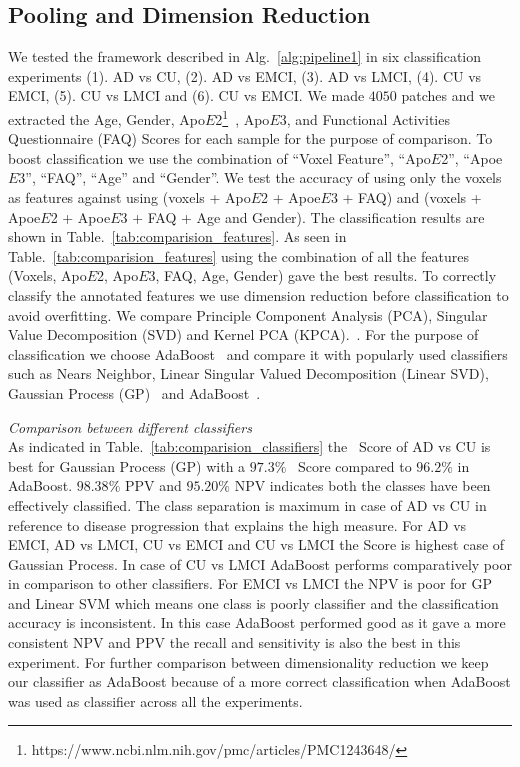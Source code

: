 \subsection{Pooling and Dimension Reduction}
\label{subsec:extraction}
We tested the framework described in Alg.~\ref{alg:pipeline1} in six classification experiments (1). AD vs CU, (2). AD vs EMCI, (3). AD vs LMCI, (4). CU vs EMCI, (5). CU vs LMCI and (6). CU vs EMCI. We made $ 4050 $ patches and we extracted the Age, Gender, Apo$E$2\footnote{https://www.ncbi.nlm.nih.gov/pmc/articles/PMC1243648/}~\citep{ghebranious2005detection,genin2011apoe}, Apo$E$3, and Functional Activities Questionnaire (FAQ) Scores for each sample for the purpose of comparison. To boost classification we use the combination of ``Voxel Feature'', ``Apo$E$2'', ``Apoe$E$3'', ``FAQ'', ``Age'' and ``Gender''. We test the accuracy of using only the voxels as features against using (voxels + Apo$ E $2 + Apoe$E$3 + FAQ) and (voxels + Apoe$E$2 + Apoe$ E $3 + FAQ + Age and Gender). The classification results are shown in Table.~\ref{tab:comparision_features}.
As seen in  Table.~\ref{tab:comparision_features} using the combination of all the features (Voxels, Apo$E$2, Apo$E$3, FAQ, Age, Gender) gave the best results.
To correctly classify the annotated features we use dimension reduction before classification to avoid overfitting. We compare Principle Component Analysis (PCA), Singular Value Decomposition (SVD) and Kernel PCA (KPCA).~\citep{mika1998kernel}. 
For the purpose of classification we choose AdaBoost~\citep*{shawe2004kernel} and compare it with popularly used classifiers such as Nears Neighbor, Linear Singular Valued Decomposition (Linear SVD), Gaussian Process (GP)~\citep{rasmussen2006gaussian} and AdaBoost~\citep{rojas2009adaboost}. 

\textit{Comparison between different classifiers}\\
As indicated in Table.~\ref{tab:comparision_classifiers} the \F~Score of AD vs CU is best for Gaussian Process (GP) with a $ 97.3 \% $ \F~Score compared to $ 96.2 \% $ in AdaBoost. $ 98.38 \% $ PPV and $ 95.20 \% $ NPV indicates both the classes have been effectively classified. The class separation is maximum in case of AD vs CU in reference to disease progression that explains the high \F measure. For AD vs EMCI, AD vs LMCI, CU vs EMCI and CU vs LMCI the \F Score is highest case of Gaussian Process. In case of CU vs LMCI AdaBoost performs comparatively poor in comparison to other classifiers. For EMCI vs LMCI the NPV is poor for GP and Linear SVM which means one class is poorly classifier and the classification accuracy is inconsistent. In this case AdaBoost performed good as it gave a more consistent NPV and PPV the recall and sensitivity is also the best in this experiment. For further comparison between dimensionality reduction we keep our classifier as AdaBoost because of a more correct classification when AdaBoost was used as classifier across all the experiments.   

